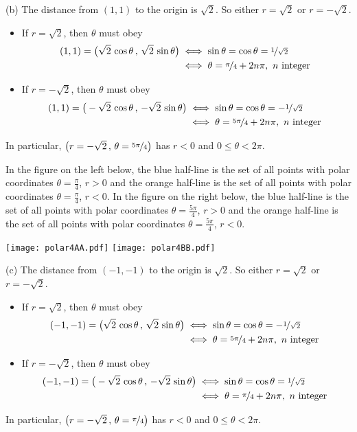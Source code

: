 \begin{solution}
(b)
The distance from $(1,1)$ to the origin is $\sqrt{2}$. 
So either $r=\sqrt{2}$ or $r=-\sqrt{2}$.
\begin{itemize}
\item If $r=\sqrt{2}$, then $\theta$ must obey 
\begin{align*}
(1,1) = \big(\sqrt{2}\,\cos\theta\,,\,\sqrt{2}\,\sin\theta\big)
&\iff \sin\theta=\cos\theta=\nicefrac{1}{\sqrt{2}} \\
&\iff \theta= \nicefrac{\pi}{4} + 2n\pi,\ n\text{ integer }
\end{align*}
\item If $r=-\sqrt{2}$, then $\theta$ must obey 
\begin{align*}
(1,1) = \big(-\sqrt{2}\,\cos\theta\,,\,-\sqrt{2}\,\sin\theta\big)
&\iff \sin\theta=\cos\theta=-\nicefrac{1}{\sqrt{2}} \\
&\iff \theta= \nicefrac{5\pi}{4} + 2n\pi,\ n\text{ integer }
\end{align*}
\end{itemize}
In particular,  $\big(r=-\sqrt{2}\,,\,
    \theta= \nicefrac{5\pi}{4}\big)$ has $r<0$
    and $0\le\theta<2\pi$.

In the figure on the left below, the blue half-line is the set of all points 
with polar coordinates $\theta=\frac{\pi}{4}$, $r>0$ and the orange half-line 
is the set of all points  with polar coordinates $\theta=\frac{\pi}{4}$, $r<0$. 
In the figure on the right below, the blue half-line is the set of all points 
with polar coordinates $\theta=\frac{5\pi}{4}$, $r>0$ and the orange 
half-line is the set of all points  with polar coordinates 
$\theta=\frac{5\pi}{4}$, $r<0$. 
\begin{center}
  \texttt{[image: polar4AA.pdf]}\qquad
  \texttt{[image: polar4BB.pdf]}
\end{center}

(c)
The distance from $(-1,-1)$ to the origin is $\sqrt{2}$. 
So either $r=\sqrt{2}$ or $r=-\sqrt{2}$.
\begin{itemize}
\item If $r=\sqrt{2}$, then $\theta$ must obey 
\begin{align*}
(-1,-1) = \big(\sqrt{2}\,\cos\theta\,,\,\sqrt{2}\,\sin\theta\big)
&\iff \sin\theta=\cos\theta=-\nicefrac{1}{\sqrt{2}} \\
&\iff \theta= \nicefrac{5\pi}{4} + 2n\pi,\ n\text{ integer }
\end{align*}
\item If $r=-\sqrt{2}$, then $\theta$ must obey 
\begin{align*}
(-1,-1) = \big(-\sqrt{2}\,\cos\theta\,,\,-\sqrt{2}\,\sin\theta\big)
&\iff \sin\theta=\cos\theta=\nicefrac{1}{\sqrt{2}} \\
&\iff \theta= \nicefrac{\pi}{4} + 2n\pi,\ n\text{ integer }
\end{align*}
\end{itemize}
In particular,  $\big(r=-\sqrt{2}\,,\,
    \theta= \nicefrac{\pi}{4}\big)$ has $r<0$
    and $0\le\theta<2\pi$.


\end{solution}
